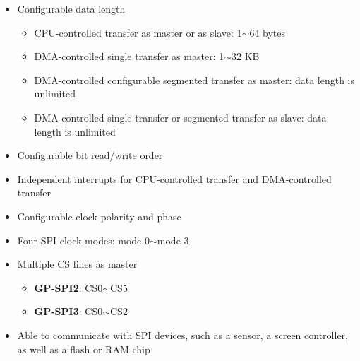 \documentclass[main\_\_EN.tex]{subfiles}
\begin{document}
\begin{itemize}
\begin{itemize}
            \item Slave: up to 60 MHz
        \end{itemize}
    \item Configurable data length
    \begin{itemize}
        \item CPU-controlled transfer as master or as slave: 1$\sim$64 bytes
        \item DMA-controlled single transfer as master: 1$\sim$32 KB
        \item DMA-controlled configurable segmented transfer as master: data length is unlimited
        \item DMA-controlled single transfer or segmented transfer as slave: data length is unlimited
    \end{itemize}
    \item Configurable bit read/write order
    \item Independent interrupts for CPU-controlled transfer and DMA-controlled transfer
    \item Configurable clock polarity and phase
    \item Four SPI clock modes: mode 0$\sim$mode 3
    \item Multiple CS lines as master
    \begin{itemize}
        \item \textbf{GP-SPI2}: CS0$\sim$CS5
        \item \textbf{GP-SPI3}: CS0$\sim$CS2
    \end{itemize}
    \item Able to communicate with SPI devices, such as a sensor, a screen controller, as well as a flash or RAM chip
\end{itemize}
\end{document}
